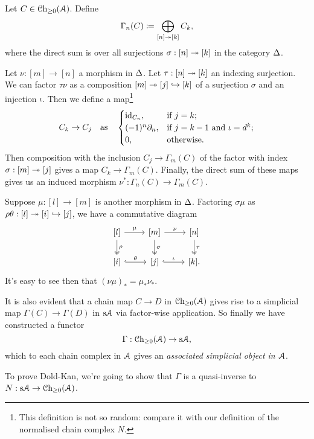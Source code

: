 \begin{definition}
  Let $C \in {\mathcal{C}\mathrm{h}}_{\ge 0}(\mathcal{A})$. Define
  \[
  \Gamma_n(C) \coloneqq \bigoplus_{[n] \twoheadrightarrow [k]} C_k,
  \]
  where the direct sum is over all surjections $\sigma : [n] \twoheadrightarrow
  [k]$ in the category $\Delta$.

  Let $\nu : [m] \to [n]$ a morphism in $\Delta$. Let $\tau : [n]
  \twoheadrightarrow [k]$ an indexing surjection. We can factor $\tau\nu$ as a
  composition $[m] \twoheadrightarrow [j] \hookrightarrow [k]$ of a surjection $\sigma$ and an
  injection $\iota$. Then we define a map\footnote{This definition is
    not so random: compare it with our definition of the normalised
    chain complex $N$.}
  \[
  C_k \to C_j \quad\text{as}\quad
  \begin{cases}
    \operatorname{id}_{C_n}, & \text{if } j = k; \\
    (-1)^n \partial_n, & \text{if } j = k-1 \text{ and } \iota=d^k; \\
    0, & \text{otherwise}.
  \end{cases}
  \]
  Then composition with the inclusion $C_j \to \Gamma_m(C)$ of the
  factor with index $\sigma : [m] \twoheadrightarrow [j]$ gives a map $C_k \to
  \Gamma_m(C)$. Finally, the direct sum of these maps gives us an
  induced morphism $\nu^* : \Gamma_n(C) \to \Gamma_m(C)$.

  Suppose $\mu : [l] \to [m]$ is another morphism in
  $\Delta$. Factoring $\sigma\mu$ as $\rho\theta : [l] \twoheadrightarrow [i]
  \hookrightarrow [j]$, we have a commutative diagram
  \[
  \begin{tikzcd}
    {[l]} \rar{\mu} \ar[twoheadrightarrow]{d}{\rho} & {[m]} \rar{\nu}
    \ar[twoheadrightarrow]{d}{\sigma} & {[n]}
    \ar[twoheadrightarrow]{d}{\tau} \\ {[i]}
    \ar[hookrightarrow]{r}{\theta} & {[j]}
    \ar[hookrightarrow]{r}{\iota} & {[k]}.
  \end{tikzcd}
  \]
  It's easy to see then that $(\nu\mu)_* = \mu_*\nu_*$.

  It is also evident that a chain map $C \to D$ in ${\mathcal{C}\mathrm{h}}_{\ge 0}(\mathcal{A})$
  gives rise to a simplicial map $\Gamma(C) \to \Gamma(D)$ in $\mathrm{s}\mathcal{A}$
  via factor-wise application. So finally we have constructed a
  functor
  \[
  \Gamma : {\mathcal{C}\mathrm{h}}_{\ge 0}(\mathcal{A}) \to \mathrm{s}\mathcal{A},
  \]
  which to each chain complex in $\mathcal{A}$ gives an \textit{associated
    simplicial object in $\mathcal{A}$}.
\end{definition}

To prove Dold-Kan, we're going to show that $\Gamma$ is a
quasi-inverse to $N : \mathrm{s}\mathcal{A} \to {\mathcal{C}\mathrm{h}}_{\ge 0}(\mathcal{A})$.

